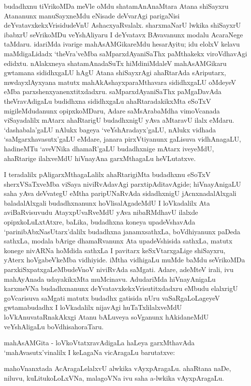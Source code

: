 budadhxnu tiVrikoMDa meVle oMdu shatamAnAnaMtara Atana shiSayxru Atananunx manuSayxneMdu eNisade deVvarAgi parigaNisi deYvatavxkekxVrisidudeVnU AshacxyaRvalalx. sharxmaNarU lwkika shiSayxrU ibabxrU seVrikoMDu veYshAliyaru I deYvatavx BAva\-vanunx modalu AcaraNege taMdaru. idariMda ivarige mahAsAMGikareMdu hesarAyitu; idu elolxV kelavu maMdigaLidadx `theVra'veMba saMparxdAyaniSaThx paMthakekx viroVdha\-vAgi edidxtu. nAlakxneya shatamAnadaSuTx hiMdiniMdaleV mahAsAMGikaru gwtamana sididhx\-gaLU hAgU Atana shiSayxrAgi ahaRtarAda sAriputarx, mwdayxlAyxyana matutx mahA\-kAshayxparaMthavara sididhxgaLU oMdeyeV eMba parxshenxyanenxtitxdadxru. saMparxdAyaniSaThx paMgaDavAda theVravAdigaLu budidhxna sididhxgaLu ahaRtaradakikxMta eSoTxV migileMdu\-danunx opipxkoMDaru, Adare saMsArabaMdha vimoVcanada viSayadalilx mAtarx ahaRtarigU budadhxnigU yAva aMtaravU ilalx eMdaru. `dashabala'gaLU nAlukx bageya `veYshAradayx'gaLU, nAlukx vidhada `saMgarxhavasutx'gaLU eMdare, janara pirxVtiyanunx gaLisuva vidhAnagaLU, hadineMTu `aveVNika dhamaR'gaLU budadhxnige mAtarx iveyeMdU, ahaRtarige ilalxveMdU hiVnayAna garxMthagaLu heVLutatxve.

I teradalilx pAligarxMthagaLalilx ahaRtarigiMta budadhxnu eSoTxV sherxVSaTxveMba viSaya niviRvAdavAgi parxtipAditavAgide; hiVnayAnigaLU saha yAva deVvategU eMtha paripUNaRvAda sidadhxnigU  jAcnxnadalAlxgali baladalAlxgali budadhxnanunx hoVlisalAga\-deMdU I loVkadalilx Ata aviBaRvisuvudu AtayxpUvaRveMdU yAva nibaRM\-dhavU ilalxde opipxkoLuLxtAtxre, baLika, budadhxna koneya upadeVshavAda `parinibAbxNa\-sUtarx'dalilx budadhxna janamxsathxLa, boVdhiyanunx paDeda sathxLa, modala bArige dhamaR\-vanunx Ata upadeVshisida sathxLa, matutx konege nivARNa hoMdida sathxLa I pavitarx keSxVtarx\-gaLige shiSayxru, yAterx hoVgabeVkeMba vidhiyide. iMtha vidhigaLu muMde baMdu seVrikoMDa parxkiSxpatxgaLeMbudeVnoV niviRvAda saMgati. Adare, adeMteV irali, ivu mahAyAnada udayakikxMta muMcinavu. AdudariMda hiVnayAnigaLu karxmeVNa budadhxnanunx deYvatavxkekxVrisutitxdadxru eMbudu elalxrigU goVcarisuva saMgati matutx budadhx gatisida nUru vaSaRgaLoLageyeV gwtamabudadhx I loVkadalilx nijavAgi huTaTxlilalxveMdU loVkAnuvataRnakAkxgi Atanu bALuveya soVganunx hAkidaneMdU veYshAligaLu boVdhisahoraTaru.

mahAsAMGita - loVkoVtatxravAdigaLa haLeya garxMthavAda `mahAvasutx'vinalilx I keLagaNa vicAragaLu barutatxve:

mahoVnanxtada AcAragaLelalxvU alwkika vAyxpAragaLu. ahaRtana naDe, niluvu, kuLitukoLoLxVNa, malagoVNa ivu saha a-lwkika vAyxpAragaLu.

